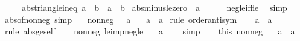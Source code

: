 \begin{isabellebody}
\ \ \ \ \ abs{\isacharunderscore}{\kern0pt}triangle{\isacharunderscore}{\kern0pt}ineq{\isacharcolon}{\kern0pt}\ {\isachardoublequoteopen}{\isasymbar}a\ {\isacharplus}{\kern0pt}\ b{\isasymbar}\ {\isasymle}\ {\isasymbar}a{\isasymbar}\ {\isacharplus}{\kern0pt}\ {\isasymbar}b{\isasymbar}{\isachardoublequoteclose}\isanewline
{}\isanewline
\isanewline
{}\isamarkupfalse%
\ abs{\isacharunderscore}{\kern0pt}minus{\isacharunderscore}{\kern0pt}le{\isacharunderscore}{\kern0pt}zero{\isacharcolon}{\kern0pt}\ {\isachardoublequoteopen}{\isacharminus}{\kern0pt}\ {\isasymbar}a{\isasymbar}\ {\isasymle}\ {}{\isachardoublequoteclose}\isanewline
%
\isadelimproof
\ \ %
\endisadelimproof
%
\isatagproof
{}\isamarkupfalse%
\ neg{\isacharunderscore}{\kern0pt}le{\isacharunderscore}{\kern0pt}{}{\isacharunderscore}{\kern0pt}iff{\isacharunderscore}{\kern0pt}le\ \isamarkupfalse%
\ simp%
\endisatagproof
{\isafoldproof}%
%
\isadelimproof
\isanewline
%
\endisadelimproof
\isanewline
{}\isamarkupfalse%
\ abs{\isacharunderscore}{\kern0pt}of{\isacharunderscore}{\kern0pt}nonneg\ {\isacharbrackleft}{\kern0pt}simp{\isacharbrackright}{\kern0pt}{\isacharcolon}{\kern0pt}\isanewline
\ \ \ nonneg{\isacharcolon}{\kern0pt}\ {\isachardoublequoteopen}{}\ {\isasymle}\ a{\isachardoublequoteclose}\isanewline
\ \ \ {\isachardoublequoteopen}{\isasymbar}a{\isasymbar}\ {\isacharequal}{\kern0pt}\ a{\isachardoublequoteclose}\isanewline
%
\isadelimproof
%
\endisadelimproof
%
\isatagproof
{}\isamarkupfalse%
\ {\isacharparenleft}{\kern0pt}rule\ order{\isachardot}{\kern0pt}antisym{\isacharparenright}{\kern0pt}\isanewline
\ \ \isamarkupfalse%
\ {\isachardoublequoteopen}a\ {\isasymle}\ {\isasymbar}a{\isasymbar}{\isachardoublequoteclose}\ \isamarkupfalse%
\ {\isacharparenleft}{\kern0pt}rule\ abs{\isacharunderscore}{\kern0pt}ge{\isacharunderscore}{\kern0pt}self{\isacharparenright}{\kern0pt}\isanewline
\ \ \isamarkupfalse%
\ nonneg\ le{\isacharunderscore}{\kern0pt}imp{\isacharunderscore}{\kern0pt}neg{\isacharunderscore}{\kern0pt}le\ \isamarkupfalse%
\ {\isachardoublequoteopen}{\isacharminus}{\kern0pt}\ a\ {\isasymle}\ {}{\isachardoublequoteclose}\ \isamarkupfalse%
\ simp\isanewline
\ \ \isamarkupfalse%
\ this\ nonneg\ \isamarkupfalse%
\ {\isachardoublequoteopen}{\isacharminus}{\kern0pt}\ a\ {\isasymle}\ a{\isachardoublequoteclose}\ \isamarkupfalse%

\end{isabellebody}
